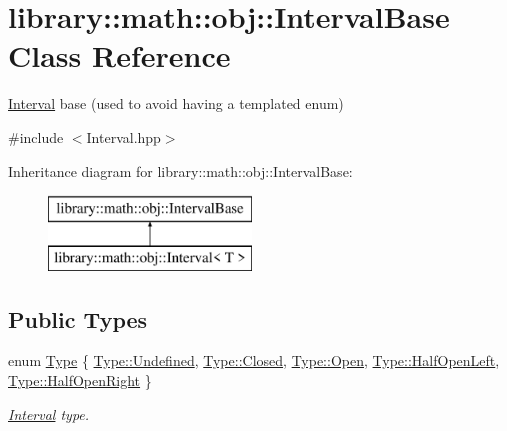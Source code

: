 \hypertarget{classlibrary_1_1math_1_1obj_1_1_interval_base}{}\section{library\+:\+:math\+:\+:obj\+:\+:Interval\+Base Class Reference}
\label{classlibrary_1_1math_1_1obj_1_1_interval_base}


\hyperlink{classlibrary_1_1math_1_1obj_1_1_interval}{Interval} base (used to avoid having a templated enum)  




{\ttfamily \#include $<$Interval.\+hpp$>$}

Inheritance diagram for library\+:\+:math\+:\+:obj\+:\+:Interval\+Base\+:\begin{figure}[H]
\begin{center}
\leavevmode
\includegraphics[height=2.000000cm]{classlibrary_1_1math_1_1obj_1_1_interval_base}
\end{center}
\end{figure}
\subsection*{Public Types}
\begin{DoxyCompactItemize}
\item 
enum \hyperlink{classlibrary_1_1math_1_1obj_1_1_interval_base_aabce6fa07a6e2e8fd3fcab5fd0d317d6}{Type} \{ \newline
\hyperlink{classlibrary_1_1math_1_1obj_1_1_interval_base_aabce6fa07a6e2e8fd3fcab5fd0d317d6aec0fc0100c4fc1ce4eea230c3dc10360}{Type\+::\+Undefined}, 
\hyperlink{classlibrary_1_1math_1_1obj_1_1_interval_base_aabce6fa07a6e2e8fd3fcab5fd0d317d6a03f4a47830f97377a35321051685071e}{Type\+::\+Closed}, 
\hyperlink{classlibrary_1_1math_1_1obj_1_1_interval_base_aabce6fa07a6e2e8fd3fcab5fd0d317d6ac3bf447eabe632720a3aa1a7ce401274}{Type\+::\+Open}, 
\hyperlink{classlibrary_1_1math_1_1obj_1_1_interval_base_aabce6fa07a6e2e8fd3fcab5fd0d317d6ab5e08f9173f660e791d3ba99ff8281d7}{Type\+::\+Half\+Open\+Left}, 
\newline
\hyperlink{classlibrary_1_1math_1_1obj_1_1_interval_base_aabce6fa07a6e2e8fd3fcab5fd0d317d6a484f1b37e0208f622a1e6f7a3ff8c2c3}{Type\+::\+Half\+Open\+Right}
 \}\begin{DoxyCompactList}\small\item\em \hyperlink{classlibrary_1_1math_1_1obj_1_1_interval}{Interval} type. \end{DoxyCompactList}
\end{DoxyCompactItemize}


